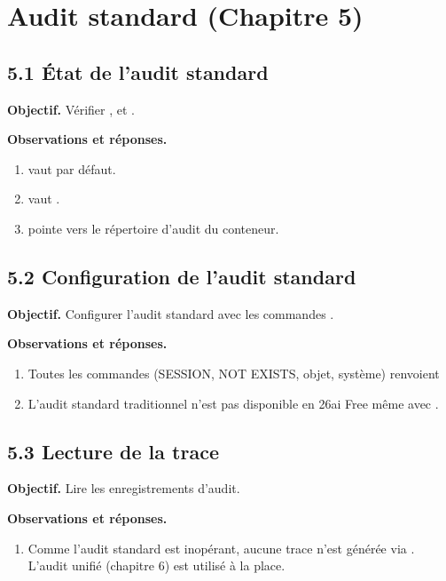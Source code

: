 \section{Audit standard (Chapitre 5)}

\subsection{5.1 État de l'audit standard}
\textbf{Objectif.} Vérifier ,  et .


\textbf{Observations et réponses.}
\begin{enumerate}
  \item {} vaut  par défaut.
  \item {} vaut .
  \item {} pointe vers le répertoire d'audit du conteneur.
\end{enumerate}

\subsection{5.2 Configuration de l'audit standard}
\textbf{Objectif.} Configurer l'audit standard avec les commandes .


\textbf{Observations et réponses.}
\begin{enumerate}
  \item Toutes les commandes  (SESSION, NOT EXISTS, objet, système) renvoient 
  \item L'audit standard traditionnel n'est pas disponible en 26ai Free même avec .
\end{enumerate}

\subsection{5.3 Lecture de la trace}
\textbf{Objectif.} Lire les enregistrements d'audit.

\textbf{Observations et réponses.}
\begin{enumerate}
  \item Comme l'audit standard est inopérant, aucune trace n'est générée via . L'audit unifié (chapitre 6) est utilisé à la place.
\end{enumerate}
